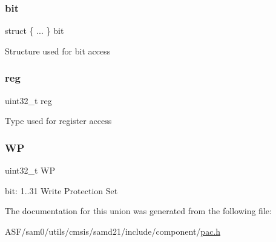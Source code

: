 \subsubsection{\texorpdfstring{bit}{bit}}
{\footnotesize\ttfamily struct \{ ... \}   bit}

Structure used for bit access \mbox{\label{union_p_a_c___w_p_s_e_t___type_a6b91636401516a477989a336376d7b40}} 
\subsubsection{\texorpdfstring{reg}{reg}}
{\footnotesize\ttfamily uint32\+\_\+t reg}

Type used for register access \mbox{\label{union_p_a_c___w_p_s_e_t___type_a086f0495fbde459e38572b5adcfae92b}} 
\subsubsection{\texorpdfstring{WP}{WP}}
{\footnotesize\ttfamily uint32\+\_\+t WP}

bit\+: 1..31 Write Protection Set 

The documentation for this union was generated from the following file\+:\begin{DoxyCompactItemize}
\item 
A\+S\+F/sam0/utils/cmsis/samd21/include/component/\mbox{\hyperlink{pac_8h}{pac.\+h}}\end{DoxyCompactItemize}
